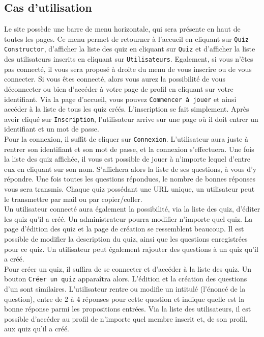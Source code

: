 \documentclass[11pt,titlepage]{article}
\begin{document}
\subsection{Cas d'utilisation}
Le site possède une barre de menu horizontale, qui sera présente en haut de toutes les pages. Ce menu permet de retourner à l'accueil en cliquant sur \texttt{Quiz Constructor}, d'afficher la liste des quiz en cliquant sur \texttt{Quiz} et d'afficher la liste des utilisateurs inscrits en cliquant sur \texttt{Utilisateurs}. Egalement, si vous n'êtes pas connecté, il vous sera proposé à droite du menu de vous inscrire ou de vous connecter. Si vous êtes connecté, alors vous aurez la possibilité de vous déconnecter ou bien d'accéder à votre page de profil en cliquant sur votre identifiant.
\medbreak
Via la page d'accueil, vous pouvez \texttt{Commencer à jouer} et ainsi accéder à la liste de tous les quiz créés.
\medbreak
L'inscription se fait simplement. Après avoir cliqué sur \texttt{Inscription}, l'utilisateur arrive sur une page où il doit entrer un identifiant et un mot de passe.\\
Pour la connexion, il suffit de cliquer sur \texttt{Connexion}. L'utilisateur aura juste à rentrer son identifiant et son mot de passe, et la connexion s'effectuera.
\medbreak
Une fois la liste des quiz affichée, il vous est possible de jouer à n'importe lequel d'entre eux en cliquant sur son nom. S'affichera alors la liste de ses questions, à vous d'y répondre. Une fois toutes les questions répondues, le nombre de bonnes réponses vous sera transmis. Chaque quiz possédant une URL unique, un utilisateur peut le transmettre par mail ou par copier/coller.\\
Un utilisateur connecté aura également la possibilité, via la liste des quiz, d'éditer les quiz qu'il a créé. Un administrateur pourra modifier n'importe quel quiz.
\medbreak
La page d'édition des quiz et la page de création se ressemblent beaucoup. Il est possible de modifier la description du quiz, ainsi que les questions enregistrées pour ce quiz. Un utilisateur peut également rajouter des questions à un quiz qu'il a créé.\\
Pour créer un quiz, il suffira de se connecter et d'accéder à la liste des quiz. Un bouton \texttt{Créer un quiz} apparaîtra alors.
\medbreak
L'édition et la création des questions d'un sont similaires. L'utilisateur rentre ou modifie un intitulé (l'énoncé de la question), entre de 2 à 4 réponses pour cette question et indique quelle est la bonne réponse parmi les propositions entrées.
\medbreak
Via la liste des utilisateurs, il est possible d'accéder au profil de n'importe quel membre inscrit et, de son profil, aux quiz qu'il a créé.
\end{document}
